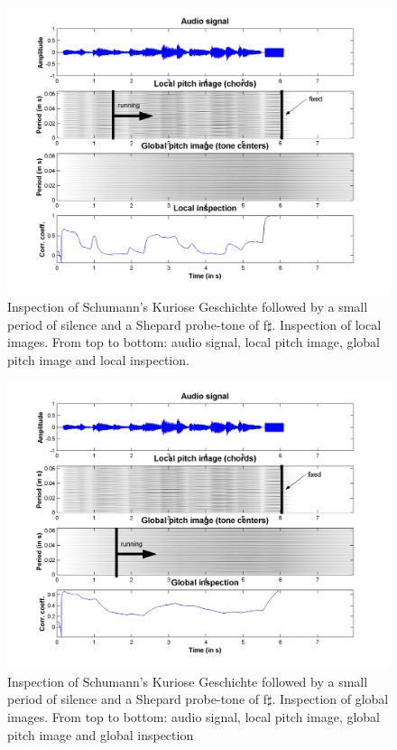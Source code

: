 \begin{figure}[h]
    \centering
    \includegraphics[width=\IPEMDefaultFigureWidth]{Graphics/ContextualityLocalInspection}
    \caption{Inspection of Schumann's Kuriose Geschichte followed
    by a small period of silence and a Shepard probe-tone of
    f$\sharp$. Inspection of local images. From top to bottom:
    audio signal, local pitch image, global pitch image and local
    inspection.} \label{Fig:ContextualityLocalInspection}
\end{figure}

\begin{figure}[h]
    \centering
    \includegraphics[width=\IPEMDefaultFigureWidth]{Graphics/ContextualityGlobalInspection}
    \caption{Inspection of Schumann's Kuriose Geschichte followed
    by a small period of silence and a Shepard probe-tone of
    f$\sharp$. Inspection of global images. From top to bottom:
    audio signal, local pitch image, global pitch image and global
    inspection} \label{Fig:ContextualityGlobalInspection}
\end{figure}

